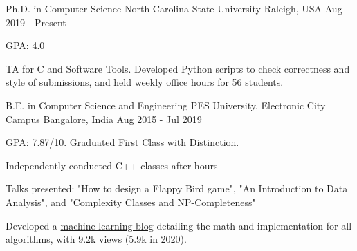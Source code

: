 

\begin{cventries}

  \cventry
    {Ph.D. in Computer Science} %
    {North Carolina State University} %
    {Raleigh, USA} %
    {Aug 2019 - Present} %
    {
    	\begin{cvitems}
    		\item {GPA: 4.0}
    		\item {TA for C and Software Tools. Developed Python scripts to check correctness and style of submissions, and held weekly office hours for 56 students.}
    	\end{cvitems}
    }

  \cventry
    {B.E. in Computer Science and Engineering} %
    {PES University, Electronic City Campus} %
    {Bangalore, India} %
    {Aug 2015 - Jul 2019} %
    {
      \begin{cvitems} %
        \item {GPA: 7.87/10. Graduated First Class with Distinction.}
        \item {Independently conducted C++ classes after-hours}
        \item {Talks presented: "How to design a Flappy Bird game", "An Introduction to Data Analysis", and "Complexity Classes and NP-Completeness"}
        \item {Developed a \href{www.beginningwithml.wordpress.com}{machine learning blog} detailing the math and implementation for all algorithms, with 9.2k views (5.9k in 2020).}
      \end{cvitems}
    }

\end{cventries}
